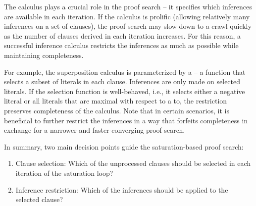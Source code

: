 The calculus plays a crucial role in the proof search -- it specifies which inferences are available in each iteration.
If the calculus is prolific (allowing relatively many inferences on a set of clauses), the proof search may slow down to a crawl quickly as the number of clauses derived in each iteration increases.
For this reason, a successful inference calculus restricts the inferences as much as possible while maintaining completeness.

For example, the superposition calculus \cite{DBLP:journals/logcom/BachmairG94}
is parameterized by a  -- a function that selects a subset of literals in each clause.
Inferences are only made on selected literals.
If the selection function is well-behaved,
i.e., it selects either a negative literal or all literals that are maximal with respect to a \gls{to},
the restriction preserves completeness of the calculus.
Note that in certain scenarios, it is beneficial to further restrict the inferences in a way that forfeits completeness
in exchange for a narrower and faster-converging proof search.



In summary, two main decision points guide the \gls{saturation}-based proof search:
\begin{enumerate}
\item Clause selection: Which of the unprocessed clauses should be selected in each iteration of the saturation loop?
\item Inference restriction: Which of the inferences should be applied to the selected clause?
\end{enumerate}

